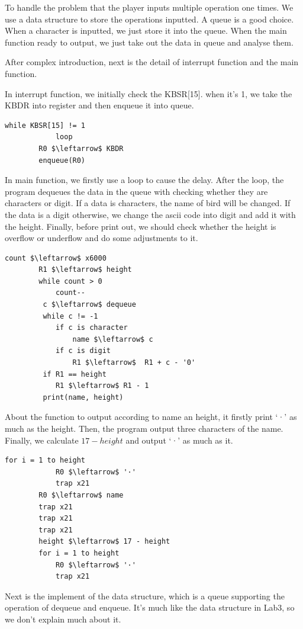 \documentclass[twoside]{article}
\begin{document}
\begin{CJK*}{UTF8}{gbsn}
	To handle the problem that the player inputs multiple operation one times. We use a data structure to store the operations inputted. A queue is a good choice. When a character is inputted, we just store it into the queue. When the main function ready to output, we just take out the data in queue and analyse them.
	
	After complex introduction, next is the detail of interrupt function and the main function.
	
	In interrupt function, we initially check the KBSR[15]. when it's 1, we take the KBDR into register and then enqueue it into queue.
	
	\begin{lstlisting}[mathescape=true]
		while KBSR[15] != 1
			loop
		R0 $\leftarrow$ KBDR
		enqueue(R0)
	\end{lstlisting}
	
	In main function, we firstly use a loop to cause the delay. After the loop, the program dequeues the data in the queue with checking whether they are characters or digit. If a data is characters, the name of bird will be changed. If the data is a digit otherwise, we change the ascii code into digit and add it with the height. Finally, before print out, we should check whether the height is overflow or underflow and do some adjustments to it.
	
	\begin{lstlisting}[mathescape=true]
		count $\leftarrow$ x6000
		R1 $\leftarrow$ height
		while count > 0
		 	count--
		 c $\leftarrow$ dequeue
		 while c != -1
		 	if c is character
		 		name $\leftarrow$ c
		 	if c is digit
		 		R1 $\leftarrow$  R1 + c - '0'
		 if R1 == height
		 	R1 $\leftarrow$ R1 - 1
		 print(name, height)
	\end{lstlisting}


	About the function to output according to name an height, it firstly print `·' as much as the height. Then, the program output three characters of the name. Finally, we calculate $17-height$ and output `·' as much as it.
	\begin{lstlisting}[mathescape=true]
		for i = 1 to height
			R0 $\leftarrow$ '·'
			trap x21
		R0 $\leftarrow$ name
		trap x21
		trap x21
		trap x21
		height $\leftarrow$ 17 - height
		for i = 1 to height
			R0 $\leftarrow$ '·'
			trap x21
	\end{lstlisting}
	
	
	Next is the implement of the data structure, which is a queue supporting the operation of dequeue and enqueue. It's much like the data structure in Lab3, so we don't explain much about it.
	

\end{CJK*}
\end{document}
